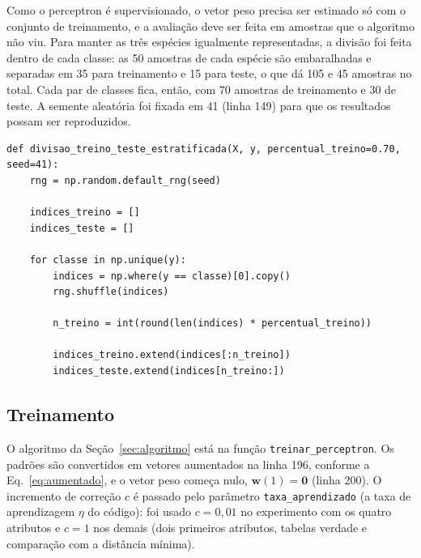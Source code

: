 \documentclass[12pt,a4paper]{article}
\begin{document}
Como o perceptron é supervisionado, o vetor peso precisa ser estimado só com o conjunto de treinamento, e a avaliação deve ser feita em amostras que o algoritmo não viu. Para manter as três espécies igualmente representadas, a divisão foi feita dentro de cada classe: as 50 amostras de cada espécie são embaralhadas e separadas em 35 para treinamento e 15 para teste, o que dá 105 e 45 amostras no total. Cada par de classes fica, então, com 70 amostras de treinamento e 30 de teste. A semente aleatória foi fixada em 41 (linha 149) para que os resultados possam ser reproduzidos.

\begin{lstlisting}[firstnumber=120,title=\texttt{pr4\_perceptron\_iris\_colab.py}]
def divisao_treino_teste_estratificada(X, y, percentual_treino=0.70, seed=41):
    rng = np.random.default_rng(seed)

    indices_treino = []
    indices_teste = []

    for classe in np.unique(y):
        indices = np.where(y == classe)[0].copy()
        rng.shuffle(indices)

        n_treino = int(round(len(indices) * percentual_treino))

        indices_treino.extend(indices[:n_treino])
        indices_teste.extend(indices[n_treino:])
\end{lstlisting}

\subsection{Treinamento}\label{sec:treinamento}

O algoritmo da Seção~\ref{sec:algoritmo} está na função \texttt{treinar\_perceptron}. Os padrões são convertidos em vetores aumentados na linha 196, conforme a Eq.~\eqref{eq:aumentado}, e o vetor peso começa nulo, $\mathbf{w}(1) = \mathbf{0}$ (linha 200). O incremento de correção $c$ é passado pelo parâmetro \texttt{taxa\_aprendizado} (a taxa de aprendizagem $\eta$ do código): foi usado $c = 0{,}01$ no experimento com os quatro atributos e $c = 1$ nos demais (dois primeiros atributos, tabelas verdade e comparação com a distância mínima).
\end{document}
